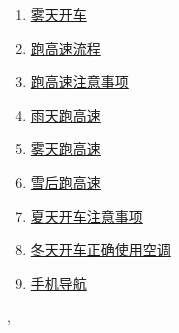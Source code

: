 \documentclass[11pt]{article}
\renewcommand{\today}{\shortmonthname[\the\month] \the \day,  \the\year}
\begin{document}
\begin{multicols}{2}
\begin{enumerate}
		\item \href{https://mp.weixin.qq.com/s/BSEpj6dAaIMfw_evsXlbKw}{雾天开车}	%
		\item \href{https://mp.weixin.qq.com/s/z8SZZQyR-DYvIaMQuNxoeg}{跑高速流程}	%
		\item \href{https://mp.weixin.qq.com/s/HRof8fM8vFj1LG-ulRFzmw}{跑高速注意事项}	%
		\item \href{https://mp.weixin.qq.com/s/SieAktOHRF3ujOfjrH8VeA}{雨天跑高速}	%
		\item \href{https://mp.weixin.qq.com/s/Lg4M-WljOHs4HYJrjSBKsA}{雾天跑高速}	%
		\item \href{https://mp.weixin.qq.com/s/czt-tIgL1s43f8Y3iq3F5Q}{雪后跑高速}	%
		\item \href{https://mp.weixin.qq.com/s/6IPiIBFaEodCqfWkOLXsuA}{夏天开车注意事项}	%
		\item \href{https://mp.weixin.qq.com/s/X40swwr9dmNxBHAlXybgsA}{冬天开车正确使用空调}	%
		\item \href{https://mp.weixin.qq.com/s/69Y_0ik19toQjuYXnQIvJg}{手机导航}	%
	\end{enumerate}
\end{multicols}


%
\begin{flushright}
	\tiny \today 
\end{flushright}
\end{document}
